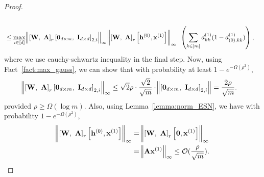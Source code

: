 \begin{proof}
\begin{align*}
		\\&\le \max_{i \in [d]} \norm{\left[\mathbf{W}, \text{ } \mathbf{A}\right]_r \left[\mathbf{0}_{d \times m}, \text{ } \mathbf{I}_{d \times d}\right]_{2, i}}_{\infty} \norm{\left[\mathbf{W}, \text{ } \mathbf{A}\right]_r \left[\mathbf{h}^{(0)}, \mathbf{x}^{(1)}\right]}_{\infty} \text{ }  \left( \sum_{k \in [m]} d^{(1)}_{kk} (1 - d^{(1)}_{(0), kk}) \right),
	\end{align*}
	\endgroup
	where we use cauchy-schwartz inequality in the final step. Now, using Fact~\ref{fact:max_gauss}, we can show that with probability at least $1 - e^{-\Omega(\rho^2)}$,
	\begin{align*}
		& \norm{\left[\mathbf{W}, \text{ } \mathbf{A}\right]_r \left[\mathbf{0}_{d \times m}, \text{ } \mathbf{I}_{d \times d}\right]_{2, i}}_{\infty} \le \sqrt{2} \rho \cdot \frac{\sqrt{2}}{\sqrt{m}} \cdot \norm{\left[\mathbf{0}_{d \times m}, \text{ } \mathbf{I}_{d \times d}\right]_{2, i}} = \frac{2\rho}{\sqrt{m}}.
	\end{align*}
	provided $\rho \ge \Omega(\log m)$. Also, using Lemma~\ref{lemma:norm_ESN}, we have with probability $1-e^{-\Omega(\rho^2)}$, 
	\begin{align*}
		\norm{\left[\mathbf{W}, \text{ } \mathbf{A}\right]_r \left[\mathbf{h}^{(0)}, \mathbf{x}^{(1)}\right]}_{\infty} &= \norm{\left[\mathbf{W}, \text{ } \mathbf{A}\right]_r \left[\mathbf{0}, \mathbf{x}^{(1)}\right]}_{\infty} \\&
		= \norm{\mathbf{A} \mathbf{x}^{(1)}}_{\infty} \le \mathcal{O}(\frac{\rho}{\sqrt{m}}).
	\end{align*}
	

\end{proof}
